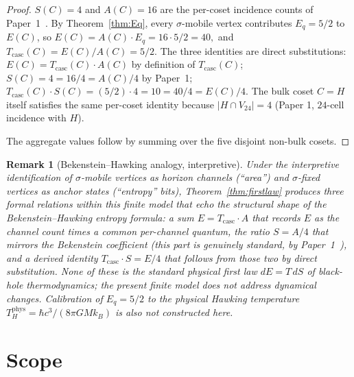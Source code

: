 \documentclass[11pt]{article}
\newtheorem{remark}{Remark}[section]
\newcommand{\Vtwentyfour}{V_{24}}
\newcommand{\sigmaG}{\sigma}
\newcommand{\Eq}{E_q}
\newcommand{\Tcasc}{T_{\mathrm{casc}}}
\begin{document}
\begin{proof}
$S(C) = 4$ and $A(C) = 16$ are the per-coset incidence counts of
Paper~1~\citep{V600Paper1}. By Theorem~\ref{thm:Eq}, every $\sigmaG$-mobile
vertex contributes $\Eq = 5/2$ to $E(C)$, so
\(
  E(C) = A(C) \cdot \Eq = 16 \cdot 5/2 = 40,
\)
and $\Tcasc(C) = E(C)/A(C) = 5/2$. The three identities are direct
substitutions:
$E(C) = \Tcasc(C) \cdot A(C)$ by definition of $\Tcasc(C)$;
$S(C) = 4 = 16/4 = A(C)/4$ by Paper~1;
$\Tcasc(C) \cdot S(C) = (5/2) \cdot 4 = 10 = 40/4 = E(C)/4$. The bulk
coset $C = H$ itself satisfies the same per-coset identity because
$|H \cap \Vtwentyfour| = 4$ (Paper 1, $24$-cell incidence with $H$).

The aggregate values follow by summing over the five disjoint non-bulk
cosets.
\end{proof}

\begin{remark}[Bekenstein--Hawking analogy, interpretive]\label{rem:BH}
Under the interpretive identification of $\sigmaG$-mobile vertices as
horizon channels (``area'') and $\sigmaG$-fixed vertices as anchor
states (``entropy'' bits), Theorem~\ref{thm:firstlaw} produces three
formal relations within this finite model that echo the structural
shape of the Bekenstein--Hawking entropy formula: a sum
$E = \Tcasc \cdot A$ that records $E$ as the channel count times a
common per-channel quantum, the ratio $S = A/4$ that mirrors the
Bekenstein coefficient (this part is genuinely standard, by
Paper~1~\citep{V600Paper1}), and a derived identity
$\Tcasc \cdot S = E/4$ that follows from those two by direct
substitution. None of these is the standard physical first law
$dE = T\,dS$ of black-hole thermodynamics; the present finite model
does not address dynamical changes. Calibration of $\Eq = 5/2$ to the
physical Hawking temperature
$T_H^{\mathrm{phys}} = \hbar c^3 / (8\pi G M k_B)$ is also not
constructed here.
\end{remark}

\section{Scope}\label{sec:scope}
\end{document}
